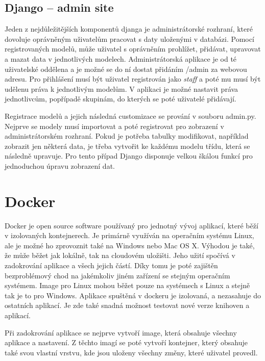 \subsection{Django – admin site}

Jeden z nejdůležitějších komponentů djanga je administrátorské
rozhraní, které dovoluje oprávněným uživatelům pracovat s daty
uloženými v databázi. Pomocí registrovaných modelů, může uživatel s
oprávněním prohlížet, přidávat, upravovat a mazat data v jednotlivých
modelech. Administrátorská aplikace je od té uživatelské oddělena a je
možné se do ní dostat přidáním /admin za webovou adresu. Pro
přihlášení musí být uživatel registrován jako \textit{staff} a poté mu
musí být udělenu práva k jednotlivým modelům. V aplikaci je možné
nastavit práva jednotlivcům, popřípadě skupinám, do kterých se poté
uživatelé přidávají.

Registrace modelů a jejich následná customizace se prování v souboru
admin.py. Nejprve se modely musí importovat a poté registrovat pro
zobrazení v administrátorském rozhraní. Pokud je potřeba tabulky
modifikovat, například zobrazit jen některá data, je třeba vytvořit ke
každému modelu třídu, která se následně upravuje. Pro tento případ
Django disponuje velkou škálou funkcí pro jednoduchou úpravu zobrazení
dat.

\newpage

\section{Docker}

Docker je open source software používaný pro jednotný vývoj aplikací,
které běží v izolovaných kontejnerech. Je primárně využíván na
operačním systému Linux, ale je možné ho zprovoznit také na Windows
nebo Mac OS X. Výhodou je také, že může běžet jak lokálně, tak na
cloudovém uložišti. Jeho užití spočívá v zadokrování aplikace a všech
jejich částí. Díky tomu je poté zajištěn bezproblémový chod na
jakémkoliv jiném zařízení se stejným operačním systémem. Image pro
Linux mohou běžet pouze na systémech s Linux a stejně tak je to pro
Windows. Aplikace spuštěná v dockeru je izolovaná, a nezasahuje do
ostatních aplikací. Je zde také snadná možnost testovat nové verze
knihoven a aplikací.

Při zadokrování aplikace se nejprve vytvoří image, která obsahuje
všechny aplikace a nastavení. Z těchto imagí se poté vytvoří
kontejner, který obsahuje také svou vlastní vrstvu, kde jsou uloženy
všechny změny, které uživatel provedl.



